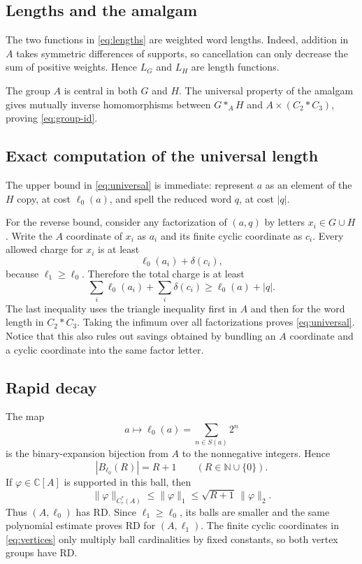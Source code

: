 \documentclass[11pt]{article}
\newcommand{\N}{\mathbb N}
\newcommand{\C}{\mathbb C}
\begin{document}
\subsection{Lengths and the amalgam}

The two functions in \eqref{eq:lengths} are weighted word lengths.  Indeed,
addition in $A$ takes symmetric differences of supports, so cancellation can
only decrease the sum of positive weights.  Hence $L_G$ and $L_H$ are length
functions.

The group $A$ is central in both $G$ and $H$.  The universal property of the
amalgam gives mutually inverse homomorphisms between $G*_AH$ and
$A\times(C_2*C_3)$, proving \eqref{eq:group-id}.

\subsection{Exact computation of the universal length}

The upper bound in \eqref{eq:universal} is immediate: represent $a$ as an
element of the $H$ copy, at cost $\ell_0(a)$, and spell the reduced word $q$,
at cost $|q|$.

For the reverse bound, consider any factorization of $(a,q)$ by letters
$x_i\in G\cup H$.  Write the $A$ coordinate of $x_i$ as $a_i$ and its finite
cyclic coordinate as $c_i$.  Every allowed charge for $x_i$ is at least
\[
                       \ell_0(a_i)+\delta(c_i),
\]
because $\ell_1\ge\ell_0$.  Therefore the total charge is at least
\[
 \sum_i\ell_0(a_i)+\sum_i\delta(c_i)
 \ge \ell_0(a)+|q|.
\]
The last inequality uses the triangle inequality first in $A$ and then for
the word length in $C_2*C_3$.  Taking the infimum over all factorizations proves
\eqref{eq:universal}.  Notice that this also rules out savings obtained by
bundling an $A$ coordinate and a cyclic coordinate into the same factor letter.

\subsection{Rapid decay}

The map
\[
             a\longmapsto\ell_0(a)=\sum_{n\in S(a)}2^n
\]
is the binary-expansion bijection from $A$ to the nonnegative integers.  Hence
\begin{equation}\label{eq:ball}
                   |B_{\ell_0}(R)|=R+1\qquad(R\in\N\cup\{0\}).
\end{equation}
If $\varphi\in\C[A]$ is supported in this ball, then
\[
 \|\varphi\|_{C_r^*(A)}\le\|\varphi\|_1
 \le\sqrt{R+1}\,\|\varphi\|_2.
\]
Thus $(A,\ell_0)$ has RD.  Since $\ell_1\ge\ell_0$, its balls are smaller and
the same polynomial estimate proves RD for $(A,\ell_1)$.  The finite cyclic
coordinates in \eqref{eq:vertices} only multiply ball cardinalities by fixed
constants, so both vertex groups have RD.
\end{document}
